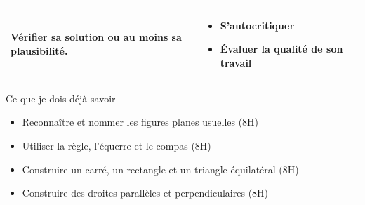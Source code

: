 \begin{tabularx}{\textwidth}{|>{\raggedright\arraybackslash}X|>{\raggedright\arraybackslash}X|}
Vérifier sa solution ou au moins sa plausibilité.
&\vspace{-1em}
\begin{itemize}[leftmargin=*, itemsep=2pt, topsep=0pt, label=$\triangleright$]
    \item S'autocritiquer
    \item Évaluer la qualité de son travail
\end{itemize} \\
\hline
\end{tabularx}
\def\arraystretch{1}

\vfill
\begin{astuce}{Ce que je dois déjà savoir}
\begin{itemize}[leftmargin=*, itemsep=2pt, topsep=2pt, label=$\triangleright$]
    \item Reconnaître et nommer les figures planes usuelles \hfill (8H)
    \item Utiliser la règle, l'équerre et le compas \hfill (8H)
    \item Construire un carré, un rectangle et un triangle équilatéral \hfill (8H)
    \item Construire des droites parallèles et perpendiculaires \hfill (8H)
\end{itemize}
\end{astuce}

